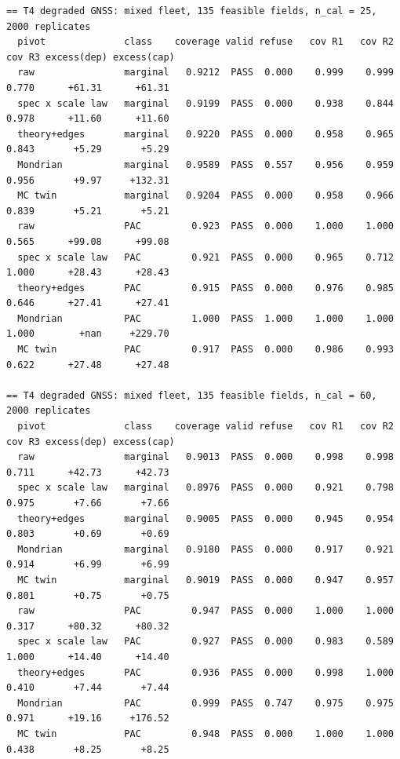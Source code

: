 \documentclass[preprint,12pt,authoryear]{elsarticle}
\begin{document}
\begin{Verbatim}[fontsize=\tiny,breaklines]
== T4 degraded GNSS: mixed fleet, 135 feasible fields, n_cal = 25, 2000 replicates
  pivot              class    coverage valid refuse   cov R1   cov R2   cov R3 excess(dep) excess(cap)
  raw                marginal   0.9212  PASS  0.000    0.999    0.999    0.770      +61.31      +61.31
  spec x scale law   marginal   0.9199  PASS  0.000    0.938    0.844    0.978      +11.60      +11.60
  theory+edges       marginal   0.9220  PASS  0.000    0.958    0.965    0.843       +5.29       +5.29
  Mondrian           marginal   0.9589  PASS  0.557    0.956    0.959    0.956       +9.97     +132.31
  MC twin            marginal   0.9204  PASS  0.000    0.958    0.966    0.839       +5.21       +5.21
  raw                PAC         0.923  PASS  0.000    1.000    1.000    0.565      +99.08      +99.08
  spec x scale law   PAC         0.921  PASS  0.000    0.965    0.712    1.000      +28.43      +28.43
  theory+edges       PAC         0.915  PASS  0.000    0.976    0.985    0.646      +27.41      +27.41
  Mondrian           PAC         1.000  PASS  1.000    1.000    1.000    1.000        +nan     +229.70
  MC twin            PAC         0.917  PASS  0.000    0.986    0.993    0.622      +27.48      +27.48

== T4 degraded GNSS: mixed fleet, 135 feasible fields, n_cal = 60, 2000 replicates
  pivot              class    coverage valid refuse   cov R1   cov R2   cov R3 excess(dep) excess(cap)
  raw                marginal   0.9013  PASS  0.000    0.998    0.998    0.711      +42.73      +42.73
  spec x scale law   marginal   0.8976  PASS  0.000    0.921    0.798    0.975       +7.66       +7.66
  theory+edges       marginal   0.9005  PASS  0.000    0.945    0.954    0.803       +0.69       +0.69
  Mondrian           marginal   0.9180  PASS  0.000    0.917    0.921    0.914       +6.99       +6.99
  MC twin            marginal   0.9019  PASS  0.000    0.947    0.957    0.801       +0.75       +0.75
  raw                PAC         0.947  PASS  0.000    1.000    1.000    0.317      +80.32      +80.32
  spec x scale law   PAC         0.927  PASS  0.000    0.983    0.589    1.000      +14.40      +14.40
  theory+edges       PAC         0.936  PASS  0.000    0.998    1.000    0.410       +7.44       +7.44
  Mondrian           PAC         0.999  PASS  0.747    0.975    0.975    0.971      +19.16     +176.52
  MC twin            PAC         0.948  PASS  0.000    1.000    1.000    0.438       +8.25       +8.25


\end{Verbatim}
\end{document}
